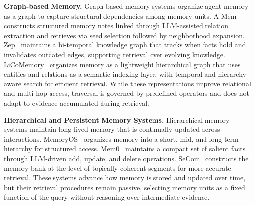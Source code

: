 \documentclass{llmxive}
\begin{document}
\textbf{Graph-based Memory.}
Graph-based memory systems organize agent memory as a graph to capture
structural dependencies among memory units. A-Mem~\cite{DBLP:journals/corr/abs-2502-12110}
constructs structured memory notes linked through LLM-assisted relation
extraction and retrieves via seed selection followed by neighborhood expansion.
Zep~\cite{DBLP:journals/corr/abs-2501-13956} maintains a bi-temporal knowledge
graph that tracks when facts hold and invalidates outdated edges, supporting
retrieval over evolving knowledge. LiCoMemory~\cite{DBLP:journals/corr/abs-2511-01448}
organizes memory as a lightweight hierarchical graph that uses entities and
relations as a semantic indexing layer, with temporal and hierarchy-aware search
for efficient retrieval. While these representations improve relational and
multi-hop access, traversal is governed by predefined operators and does not
adapt to evidence accumulated during retrieval.

\textbf{Hierarchical and Persistent Memory Systems.}
Hierarchical memory systems maintain long-lived memory that is continually
updated across interactions. MemoryOS~\cite{DBLP:journals/corr/abs-2506-06326}
organizes memory into a short, mid, and long-term hierarchy for structured
access. Mem0~\cite{DBLP:journals/corr/abs-2504-19413} maintains a compact set of
salient facts through LLM-driven add, update, and delete operations.
SeCom~\cite{pan2025secom} constructs the memory bank at the level of topically coherent segments for more accurate retrieval.  These systems advance how
memory is stored and updated over time, but their retrieval procedures remain
passive, selecting memory units as a fixed function of the query without
reasoning over intermediate evidence.
\end{document}
